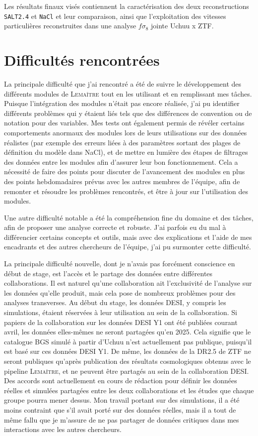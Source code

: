 \documentclass{book}
\def\lemaitre{\textsc{Lemaître}\xspace}
\def\nacl{\texttt{NaCl}\xspace}
\def\saltd{\texttt{SALT2.4}\xspace}
\begin{document}
Les résultats finaux visés contiennent la caractérisation des deux reconstructions \saltd et \nacl et leur comparaison, ainsi que l'exploitation des vitesses particulières reconstruites dans une analyse $f\sigma_8$ jointe Uchuu x ZTF.

\section{Difficultés rencontrées}

La principale difficulté que j'ai rencontré a été de suivre le développement des différents modules de \lemaitre tout en les utilisant et en remplissant mes tâches. Puisque l'intégration des modules n'était pas encore réalisée, j'ai pu identifier différents problèmes qui y étaient liés tels que des différences de convention ou de notation pour des variables. Mes tests ont également permis de révéler certains comportements anormaux des modules lors de leurs utilisations sur des données réalistes (par exemple des erreurs liées à des paramètres sortant des plages de définition du modèle dans NaCl), et de mettre en lumière des étapes de filtrages des données entre les modules afin d'assurer leur bon fonctionnement. Cela a nécessité de faire des points pour discuter de l'avancement des modules en plus des points hebdomadaires prévus avec les autres membres de l'équipe, afin de remonter et résoudre les problèmes rencontrés, et être à jour sur l'utilisation des modules.

Une autre difficulté notable a été la compréhension fine du domaine et des tâches, afin de proposer une analyse correcte et robuste. J'ai parfois eu du mal à différencier certains concepts et outils, mais avec des explications et l'aide de mes encadrants et des autres chercheurs de l'équipe, j'ai pu surmonter cette difficulté.

La principale difficulté nouvelle, dont je n'avais pas forcément conscience en début de stage, est l'accès et le partage des données entre différentes collaborations. Il est naturel qu'une collaboration ait l'exclusivité de l'analyse sur les données qu'elle produit, mais cela pose de nombreux problèmes pour des analyses transverses. Au début du stage, les données DESI, y compris les simulations, étaient réservées à leur utilisation au sein de la collaboration. Si papiers de la collaboration sur les données DESI Y1 ont été publiées courant avril, les données elles-mêmes ne seront partagées qu'en 2025. Cela signifie que le catalogue BGS simulé à partir d'Uchuu n'est actuellement pas publique, puisqu'il est basé sur ces données DESI Y1. De même, les données de la DR2.5 de ZTF ne seront publiques qu'après publication des résultats cosmologiques obtenus avec le pipeline \lemaitre, et ne peuvent être partagés au sein de la collaboration DESI. Des accords sont actuellement en cours de rédaction pour définir les données réelles et simulées partagées entre les deux collaborations et les études que chaque groupe pourra mener dessus. Mon travail portant sur des simulations, il a été moins contraint que s'il avait porté sur des données réelles, mais il a tout de même fallu que je m'assure de ne pas partager de données critiques dans mes interactions avec les autres chercheurs.
\end{document}
